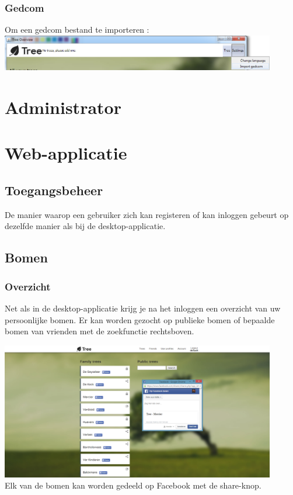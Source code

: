 \documentclass[pdftex,a4paper,12pt,twoside]{report}
\begin{document}
\subsection{Gedcom}
Om een gedcom bestand te importeren :
\includegraphics[width=12cm]{images/import_gedcom.png}\\[.5cm]


\chapter{Administrator}


\chapter{Web-applicatie}
\section{Toegangsbeheer}
De manier waarop een gebruiker zich kan registeren of kan inloggen gebeurt op dezelfde manier als bij de desktop-applicatie.
\section{Bomen}
\subsection{Overzicht}
Net als in de desktop-applicatie krijg je na het inloggen een overzicht van uw persoonlijke bomen. Er kan worden gezocht op publieke bomen of bepaalde bomen van vrienden met de zoekfunctie rechtsboven.

\includegraphics[width=12cm]{images/web_treeoverview.png}\\[.5cm]
Elk van de bomen kan worden gedeeld op Facebook met de share-knop.
\end{document}

